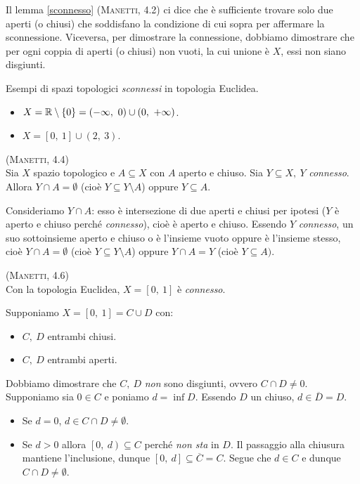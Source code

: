 \begin{observe}
	Il lemma \ref{sconnesso} \textsc{(Manetti, 4.2)} ci dice che è sufficiente trovare solo due aperti (o chiusi) che soddisfano la condizione di cui sopra per affermare la sconnessione. Viceversa, per dimostrare la connessione, dobbiamo dimostrare che per ogni coppia di aperti (o chiusi) non vuoti, la cui unione è $X$, essi non siano disgiunti.
\end{observe}
\begin{example} Esempi di spazi topologici \textit{sconnessi} in topologia Euclidea.
	\begin{itemize}
		\item $X=\realset\setminus\left\{0\right\}=\left(-\infty,\ 0\right)\cup \left(0,\ +\infty\right)$.
		\item $X=\left[0,\ 1\right]\cup \left(2,\ 3\right)$.
	\end{itemize}
\end{example}
\begin{lemming}\textsc{(Manetti, 4.4)}\\
Sia $X$ spazio topologico e $A\subseteq X$ con $A$ aperto e chiuso. Sia $Y\subseteq X,\ Y$ \textit{connesso}. Allora $Y\cap A=\emptyset$ (cioè $Y\subseteq Y\setminus A$) oppure $Y\subseteq A$. 
\end{lemming}
\begin{demonstration}
Consideriamo $Y\cap A$: esso è intersezione di due aperti e chiusi per ipotesi ($Y$ è aperto e chiuso perché \textit{connesso}), cioè è aperto e chiuso. Essendo $Y$ \textit{connesso}, un suo sottoinsieme aperto e chiuso o è l'insieme vuoto oppure è l'insieme stesso, cioè $Y\cap A=\emptyset$ (cioè $Y\subseteq Y\setminus A$) oppure $Y\cap A=Y$ (cioè $Y\subseteq A)$.
\end{demonstration}
\begin{theorema}\textsc{(Manetti, 4.6)}\\
Con la topologia Euclidea, $X=\left[0,\ 1\right]$ è \textit{connesso}.
\end{theorema}
\begin{demonstration}
Supponiamo $X=\left[0,\ 1\right]=C\cup D$ con:
\begin{itemize}
	\item $C,\ D$ entrambi chiusi.
	\item $C,\ D$ entrambi aperti.
\end{itemize}
Dobbiamo dimostrare che $C,\ D$ \textit{non} sono disgiunti, ovvero $C\cap D\neq 0$. Supponiamo sia $0\in C$ e poniamo $d=\inf D$. Essendo $D$ un chiuso, $d\in \overline{D}=D$.
\begin{itemize}
	\item Se $d=0$, $d\in C\cap D\neq \emptyset$.
	\item Se $d>0$ allora $\left[0,\ d\right)\subseteq C$ perché \textit{non sta} in $D$. Il passaggio alla chiusura mantiene l'inclusione, dunque $\left[0,\ d\right]\subseteq \overline{C}=C$. Segue che $d\in C$ e dunque $C\cap D\neq \emptyset$.
\end{itemize}
\end{demonstration}

